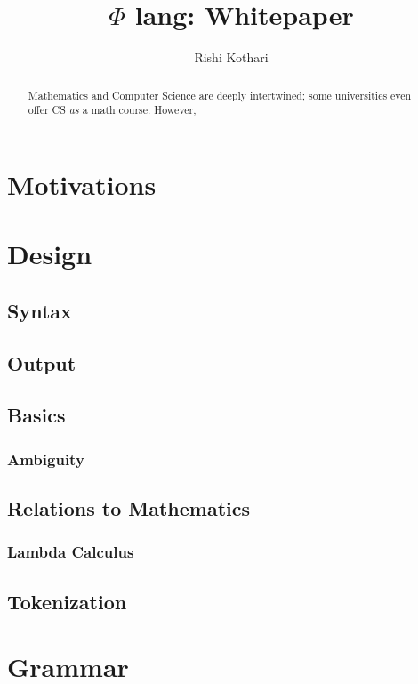 \documentclass[]{report}
\title{$\Phi$ lang: Whitepaper}
\author{Rishi Kothari}
\date{}
\begin{document}
\maketitle

\newpage

\tableofcontents
\newpage
{}
\renewcommand{\abstractname}{Summary}
\begin{abstract}
	Mathematics and Computer Science are deeply intertwined; some universities even offer CS \textit{as} a math course. However, 
\end{abstract}

\chapter{Motivations}


\chapter{Design}

\section{Syntax}


\section{Output}


\section{Basics}


\subsection{Ambiguity}


\section{Relations to Mathematics}

\subsection{Lambda Calculus}

\section{Tokenization}

\chapter{Grammar}

\section{}
\end{document}
